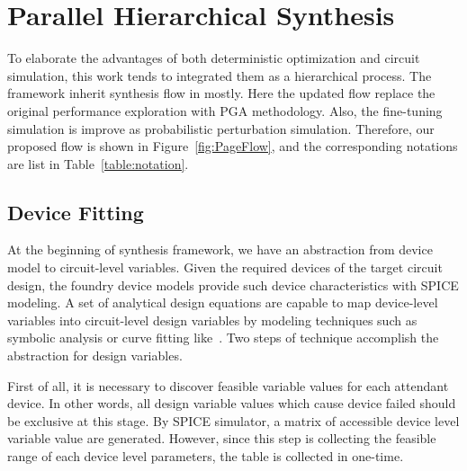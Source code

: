 
\chapter{Parallel Hierarchical Synthesis}\label{chap:hsf} 

  To elaborate the advantages of both deterministic optimization and circuit simulation, this work tends to integrated them as a hierarchical process. The framework inherit synthesis flow in \cite{PerfMap_ISQED2011} mostly. Here the updated flow replace the original performance exploration with PGA methodology. Also, the fine-tuning simulation is improve as probabilistic perturbation simulation. Therefore, our proposed flow is shown in Figure~\ref{fig:PageFlow}, and the corresponding notations are list in Table~\ref{table:notation}.

  


  \section{Device Fitting}\label{sec:devFit}
    
    At the beginning of synthesis framework, we have an abstraction from device model to circuit-level variables. Given the required devices of the target circuit design, the foundry device models provide such device characteristics with SPICE modeling. A set of analytical design equations are capable to map device-level variables into circuit-level design variables by modeling techniques such as symbolic analysis or curve fitting like~\cite{PWL_Convex_GP,Eeckelaert_DATE2003,Daems_DAC2002}. Two steps of technique accomplish the abstraction for design variables. 

    First of all, it is necessary to discover feasible variable values for each attendant device. In other words, all design variable values which cause device failed should be exclusive at this stage. By SPICE simulator, a matrix of accessible device level variable value are generated. However, since this step is collecting the feasible range of each device level parameters, the table is collected in one-time. 
    
